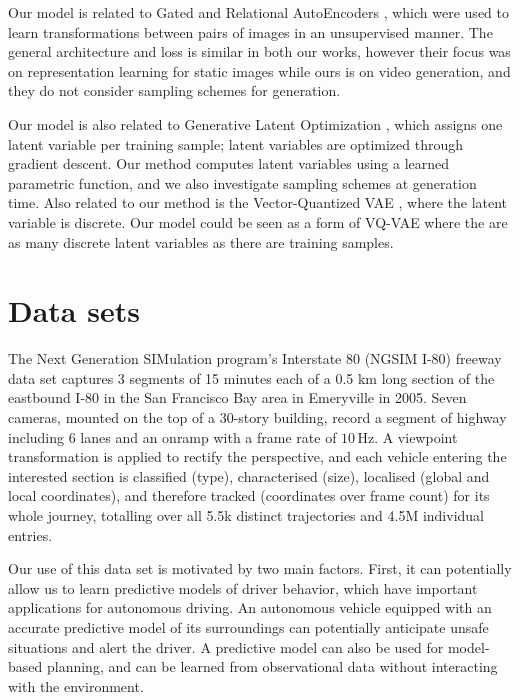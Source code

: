 \documentclass{article}
\begin{document}
Our model is related to Gated and Relational AutoEncoders \citep{RelationalAE, GAE}, which were used to learn transformations between pairs of images in an unsupervised manner.
The general architecture and loss is similar in both our works, however their focus was on representation learning for static images while ours is on video generation, and they do not consider sampling schemes for generation.

Our model is also related to Generative Latent Optimization \citep{GLO}, which assigns one latent variable per training sample; latent variables are optimized through gradient descent.
Our method computes latent variables using a learned parametric function, and we also investigate sampling schemes at generation time.
Also related to our method is the Vector-Quantized VAE \citep{VQVAE}, where the latent variable is discrete.
Our model could be seen as a form of VQ-VAE where the are as many discrete latent variables as there are training samples.



\section{Data sets}

The Next Generation SIMulation program's Interstate 80 (NGSIM I-80) freeway data set \cite{halkias2006ngsim} captures 3 segments of 15 minutes each of a 0.5 km long section of the eastbound I-80 in the San Francisco Bay area in Emeryville in 2005.
Seven cameras, mounted on the top of a 30-story building, record a segment of highway including 6 lanes and an onramp with a frame rate of $10\,\text{Hz}$.
A viewpoint transformation is applied to rectify the perspective, and each vehicle entering the interested section is classified (type), characterised (size), localised (global and local coordinates), and therefore tracked (coordinates over frame count) for its whole journey, totalling over all 5.5k distinct trajectories and 4.5M individual entries.

Our use of this data set is motivated by two main factors.
First, it can potentially allow us to learn predictive models of driver behavior, which have important applications for autonomous driving.
An autonomous vehicle equipped with an accurate predictive model of its surroundings can potentially anticipate unsafe situations and alert the driver.
A predictive model can also be used for model-based planning, and can be learned from observational data without interacting with the environment.
\end{document}
